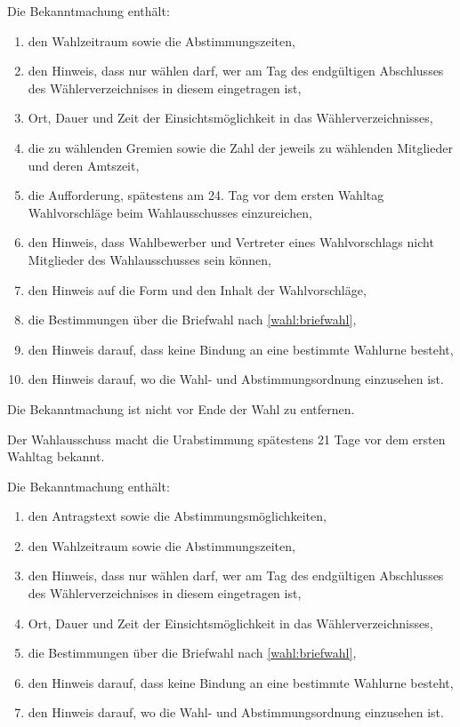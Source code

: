 Die Bekanntmachung enthält:
\begin{enumerate}
     \item den Wahlzeitraum sowie die Abstimmungszeiten,
     \item den Hinweis, dass nur wählen darf, wer am Tag des endgültigen Abschlusses des Wählerverzeichnises in diesem eingetragen ist,
     \item Ort, Dauer und Zeit der Einsichtsmöglichkeit in das Wählerverzeichnisses,
     \item die zu wählenden Gremien sowie die Zahl der jeweils zu wählenden Mitglieder und deren Amtszeit,
     \item die Aufforderung, spätestens am 24. Tag vor dem ersten Wahltag Wahlvorschläge beim Wahlausschusses einzureichen, 
     \item den Hinweis, dass Wahlbewerber und Vertreter eines Wahlvorschlags nicht Mitglieder des Wahlausschusses sein können,
     \item den Hinweis auf die Form und den Inhalt der Wahlvorschläge,
     \item die Bestimmungen über die Briefwahl nach \ref{wahl:briefwahl},
     \item den Hinweis darauf, dass keine Bindung an eine bestimmte Wahlurne besteht,
     \item den Hinweis darauf, wo die Wahl- und Abstimmungsordnung einzusehen ist.
\end{enumerate}

Die Bekanntmachung ist nicht vor Ende der Wahl zu entfernen.

\label{wahl:bekanntmachung-ua}
Der Wahlausschuss macht die Urabstimmung spätestens 21 Tage vor dem ersten Wahltag bekannt.

Die Bekanntmachung enthält:
\begin{enumerate}
     \item den Antragstext sowie die Abstimmungsmöglichkeiten,
     \item den Wahlzeitraum sowie die Abstimmungszeiten,
     \item den Hinweis, dass nur wählen darf, wer am Tag des endgültigen Abschlusses des Wählerverzeichnises in diesem eingetragen ist,
     \item Ort, Dauer und Zeit der Einsichtsmöglichkeit in das Wählerverzeichnisses,
     \item die Bestimmungen über die Briefwahl nach \ref{wahl:briefwahl},
     \item den Hinweis darauf, dass keine Bindung an eine bestimmte Wahlurne besteht,
     \item den Hinweis darauf, wo die Wahl- und Abstimmungsordnung einzusehen ist.
\end{enumerate}

